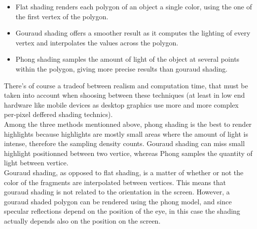 \begin{itemize}
    \item Flat shading renders each polygon of an object a single color, using
    the one of the first vertex of the polygon.
    \item Gouraud shading offers a smoother result as it computes the lighting of
    every vertex and interpolates the values across the polygon.
    \item Phong shading samples the amount of light of the object at several points
    within the polygon, giving more precise results than gouraud shading.
\end{itemize}
There's of course a tradeof between realism and computation time, that must be taken
into account when shoosing between these techniques (at least in low end hardware
like mobile devices as desktop graphics use more and more complex per-pixel deffered
shading technics).\\
Among the three methods mentionned above, phong shading is the best to render highlights
because highlights are mostly small areas where the amount of light is intense,
therefore the sampling density counts. Gouraud shading can miss small highlight
positionned between two vertice, whereas Phong samples the quantity of light between
vertice. \\
Gouraud shading, as opposed to flat shading, is a matter of whether or not the color of the fragments
are interpolated between vertices. This means that gouraud shading is not related to the orientation in the screen.
However, a gouraud shaded polygon can be rendered using the phong model, and since specular reflections depend on 
the position of the eye, in this case the shading actually depends also on the position on the screen.

